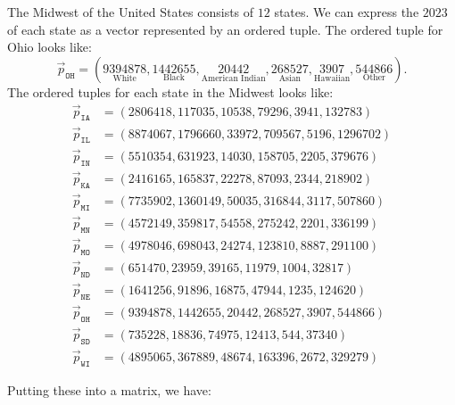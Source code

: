 \documentclass{ximera}
\begin{document}
 
\begin{example} %
  The Midwest of the United States consists of $12$ states. We can
  express the $2023$
  of each state as a vector represented by an ordered tuple. The
  ordered tuple for Ohio looks like:
  \[
  \vec{p}_{\texttt{OH}} = (\underset{\text{White}}{9394878},\underset{\text{Black}}{1442655},\underset{\text{American Indian}}{20442},\underset{\text{Asian}}{268527},\underset{\text{Hawaiian}}{3907},\underset{\text{Other}}{544866}).
  \]
  The ordered tuples for each state in the Midwest looks like:
\begin{align*}
  \vec{p}_{\texttt{IA}} &= (2806418,117035,10538,79296,3941,132783)\\
  \vec{p}_{\texttt{IL}} &= (8874067,1796660,33972,709567,5196,1296702)\\
  \vec{p}_{\texttt{IN}} &= (5510354,631923,14030,158705,2205,379676)\\
  \vec{p}_{\texttt{KA}} &= (2416165,165837,22278,87093,2344,218902)\\
  \vec{p}_{\texttt{MI}} &= (7735902,1360149,50035,316844,3117,507860)\\
  \vec{p}_{\texttt{MN}} &= (4572149,359817,54558,275242,2201,336199)\\
  \vec{p}_{\texttt{MO}} &= (4978046,698043,24274,123810,8887,291100)\\
  \vec{p}_{\texttt{ND}} &= (651470,23959,39165,11979,1004,32817)\\
  \vec{p}_{\texttt{NE}} &= (1641256,91896,16875,47944,1235,124620)\\
  \vec{p}_{\texttt{OH}} &= (9394878,1442655,20442,268527,3907,544866)\\
  \vec{p}_{\texttt{SD}} &= (735228,18836,74975,12413,544,37340)\\
  \vec{p}_{\texttt{WI}} &= (4895065,367889,48674,163396,2672,329279)
\end{align*}

Putting these into a matrix, we have: 


\end{example}
\end{document}
